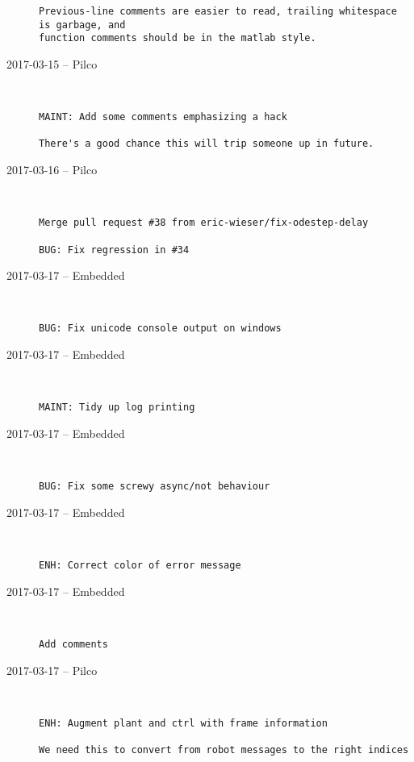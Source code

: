 \begin{description}
\begin{lstlisting}
Previous-line comments are easier to read, trailing whitespace is garbage, and
function comments should be in the matlab style.
\end{lstlisting}


  \item[2017-03-15 -- Pilco] \hfill \
\begin{lstlisting}
MAINT: Add some comments emphasizing a hack

There's a good chance this will trip someone up in future.
\end{lstlisting}


  \item[2017-03-16 -- Pilco] \hfill \
\begin{lstlisting}
Merge pull request #38 from eric-wieser/fix-odestep-delay

BUG: Fix regression in #34\end{lstlisting}


  \item[2017-03-17 -- Embedded] \hfill \
\begin{lstlisting}
BUG: Fix unicode console output on windows
\end{lstlisting}


  \item[2017-03-17 -- Embedded] \hfill \
\begin{lstlisting}
MAINT: Tidy up log printing
\end{lstlisting}


  \item[2017-03-17 -- Embedded] \hfill \
\begin{lstlisting}
BUG: Fix some screwy async/not behaviour
\end{lstlisting}


  \item[2017-03-17 -- Embedded] \hfill \
\begin{lstlisting}
ENH: Correct color of error message
\end{lstlisting}


  \item[2017-03-17 -- Embedded] \hfill \
\begin{lstlisting}
Add comments
\end{lstlisting}


  \item[2017-03-17 -- Pilco] \hfill \
\begin{lstlisting}
ENH: Augment plant and ctrl with frame information

We need this to convert from robot messages to the right indices
\end{lstlisting}



\end{description}
